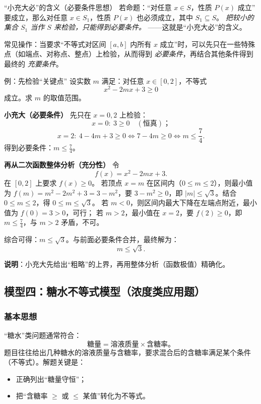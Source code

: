 \documentclass[a4paper,11pt]{ctexart}
\begin{document}
\begin{notebox}{“小充大必”的含义（必要条件思想）}
若命题：“对任意 $x\in S$，性质 $P(x)$ 成立” 要成立，那么对任意 $x\in S_1$，性质 $P(x)$ 也必须成立，其中 $S_1\subseteq S$。  
\emph{把较小的集合 $S_1$ 当作 $S$ 来检验，只能得到必要条件。}  
——这就是“小充大必”的含义。
\end{notebox}

常见操作：当要求“不等式对区间 $[a,b]$ 内所有 $x$ 成立”时，可以先只在一些特殊点（如端点、对称点、整点）上检验，从而得到 \emph{必要条件}，再结合其他条件得到最终的 \emph{充要条件}。

\begin{examplebox}[mathnote coverage=soft]{例：先检验“关键点”}
设实数 $m$ 满足：对任意 $x\in[0,2]$，不等式
\[
x^2-2mx+3\ge 0
\]
成立。求 $m$ 的取值范围。

\textbf{小充大（必要条件）}  
先只在 $x=0,2$ 上检验：
\[
x=0:\ 3\ge 0 \quad(\text{恒真})；
\]
\[
x=2:\ 4-4m+3\ge 0\iff 7-4m\ge 0\iff m\le \frac{7}{4}.
\]
得到必要条件：$m\le\frac{7}{4}$。

\textbf{再从二次函数整体分析（充分性）}  
令
\[
f(x)=x^2-2mx+3.
\]
在 $[0,2]$ 上要求 $f(x)\ge 0$。  
若顶点 $x=m$ 在区间内（$0\le m\le 2$），则最小值为 $f(m)=m^2-2m^2+3=3-m^2$，要 $3-m^2\ge 0$，即 $|m|\le\sqrt{3}$。结合 $0\le m\le 2$，得 $0\le m\le\sqrt{3}$。  
若 $m<0$，则区间内最大下降在左端点附近，最小值为 $f(0)=3>0$，可行；  
若 $m>2$，最小值在 $x=2$，要 $f(2)\ge 0$，即 $m\le\frac{7}{4}$，与 $m>2$ 矛盾，不可。

综合可得：$m\le\sqrt{3}$。与前面必要条件合并，最终解为：
\[
m\le\sqrt{3}.
\]

\textbf{说明}：小充大先给出“粗略”的上界，再用整体分析（函数极值）精确化。
\end{examplebox}

\subsection{模型四：糖水不等式模型（浓度类应用题）}

\subsubsection*{基本思想}

“糖水”类问题通常符合：
\[
\text{糖量}=\text{溶液质量}\times\text{含糖率}。
\]
题目往往给出几种糖水的溶液质量与含糖率，要求混合后的含糖率满足某个条件（不等式）。解题关键是：
\begin{itemize}
  \item 正确列出“糖量守恒”；
  \item 把“含糖率 $\ge$ 或 $\le$ 某值”转化为不等式。
\end{itemize}
\end{document}
